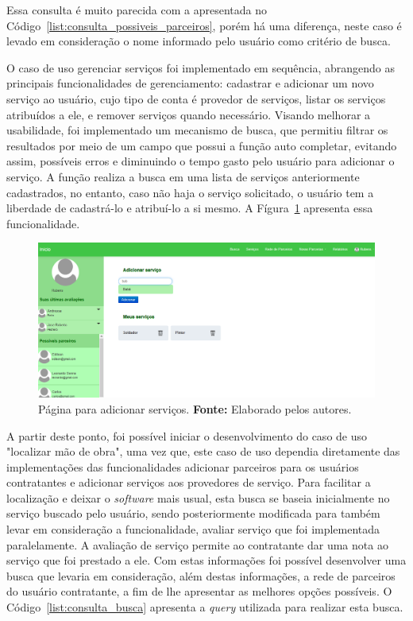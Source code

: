 \par Essa consulta é muito parecida com a apresentada no Código~\ref{list:consulta_possiveis_parceiros}, porém há uma diferença, neste caso é levado em consideração o nome informado pelo usuário como critério de busca.
 

\par O caso de uso gerenciar serviços foi implementado em sequência, abrangendo as principais funcionalidades de gerenciamento: cadastrar e adicionar um novo serviço ao usuário, cujo tipo de conta é provedor de serviços, listar os serviços atribuídos a ele, e remover serviços quando necessário. Visando melhorar a usabilidade, foi implementado um mecanismo de busca, que permitiu filtrar os resultados por meio de um campo que possui a função  auto completar, evitando assim, possíveis erros e diminuindo o tempo gasto pelo usuário para adicionar o serviço. A função realiza a busca em uma lista de serviços anteriormente cadastrados, no entanto, caso não haja o serviço solicitado, o usuário tem a liberdade de cadastrá-lo e atribuí-lo a si mesmo. A Fígura~\ref{fig:adicionar_servicos} apresenta essa funcionalidade.

\begin{figure}[h!]
	\centerline{\includegraphics[scale=0.3]{./imagens/adcionar-servico.png}}
	\caption[Página para adicionar serviços.]
	{Página para adicionar serviços. \textbf{Fonte:} Elaborado pelos autores.}
	\label{fig:adicionar_servicos}
\end{figure}


\par A partir deste ponto, foi possível iniciar o desenvolvimento do caso de uso "localizar mão de obra", uma vez que, este caso de uso dependia diretamente das implementações das funcionalidades adicionar parceiros para os usuários contratantes e adicionar serviços aos provedores de serviço. Para facilitar a localização e deixar o \textit{software} mais usual, esta busca se baseia inicialmente no serviço buscado pelo usuário, sendo posteriormente modificada para também levar em consideração a funcionalidade, avaliar serviço que foi implementada paralelamente. A avaliação de serviço permite ao contratante dar uma nota ao serviço que foi prestado a ele. Com estas informações foi possível desenvolver uma busca que levaria em consideração, além destas informações, a rede de parceiros do usuário contratante, a fim de lhe apresentar as melhores opções possíveis. O Código~\ref{list:consulta_busca} apresenta a \textit{query} utilizada para realizar esta busca.


